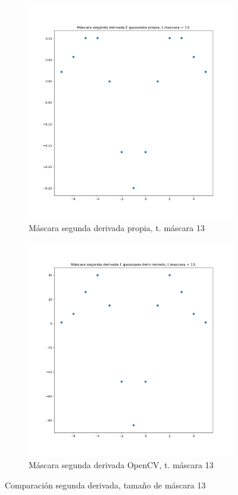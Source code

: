 \documentclass[12pt, spanish]{article}
\begin{document}
\begin{figure}[H]
  \centering
	\begin{subfigure}[t]{0.4\textwidth}
		\centering
		\includegraphics[width = \textwidth]{cmp-2p13.png}
 		 \caption{Máscara segunda derivada propia, t. máscara 13}
	\end{subfigure}
	\hspace{1cm}
	\begin{subfigure}[t]{0.4\textwidth}
		\centering
		\includegraphics[width = \textwidth]{cmp-2cv13.png}
 		 \caption{Máscara segunda derivada OpenCV, t. máscara 13}
	\end{subfigure}
	\caption{Comparación segunda derivada, tamaño de máscara 13}


\end{figure}
\end{document}
